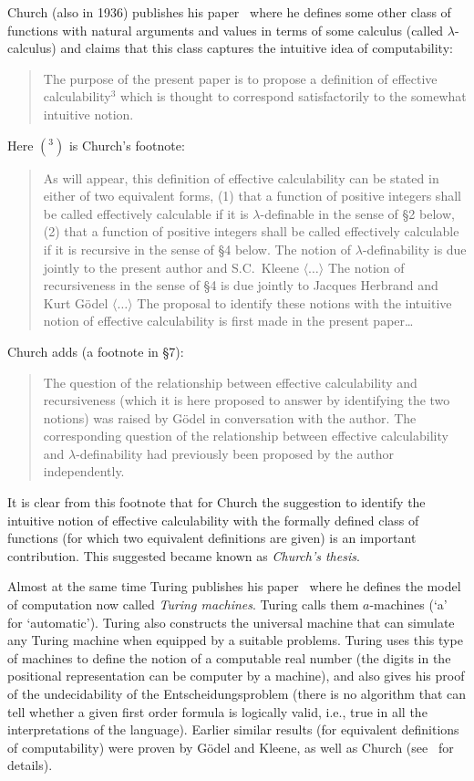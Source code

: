 \documentclass[12pt]{article}
\theoremstyle{remark}
\begin{document}
Church (also in 1936) publishes his paper~\cite{Church1936} where he defines some other class of functions with natural arguments and values in terms of some calculus (called $\lambda$-calculus) and claims that this class captures the intuitive idea of computability:
\begin{quote}
The purpose of the present paper is to propose a definition of effective calculability${}^3$ which is thought to correspond satisfactorily to the somewhat intuitive notion.
\end{quote}
Here $({}^3)$ is Church's footnote: 
\begin{quote}
As will appear, this definition of effective calculability can be stated in either of two equivalent forms, (1) that a function of positive integers shall be called effectively calculable if it is $\lambda$-definable in the sense of \S2 below, (2) that a function of positive integers shall be called effectively calculable if it is recursive in the sense of \S4 below. The notion of $\lambda$-definability is due jointly to the present author and S.C.~Kleene $\langle\ldots\rangle$ The notion of recursiveness in the sense of \S4 is due jointly to Jacques Herbrand and Kurt G\"odel $\langle\ldots\rangle$ The proposal to identify these notions with the intuitive notion of effective calculability is first made in the present paper\ldots
\end{quote}
Church adds (a footnote in \S7): 
\begin{quote}
The question of the relationship between effective calculability and recursiveness (which it is here proposed to answer by identifying the two notions) was raised by G\"{o}del in conversation with the author. The corresponding question of the relationship between effective calculability and $\lambda$-definability had previously been proposed by the author independently.
\end{quote}

It is clear from this footnote that for Church the suggestion to identify the intuitive notion of effective calculability with the formally defined class of functions (for which two equivalent definitions are given) is an important contribution. This suggested became known as \emph{Church's thesis}.

Almost at the same time Turing publishes his paper~\cite{Church1936} where he defines the model of computation now called \emph{Turing machines}. Turing calls them $a$-machines (`a' for `automatic'). Turing also constructs the universal machine that can simulate any Turing machine when equipped by a suitable problems. Turing uses this type of machines to define the notion of a computable real number (the digits in the positional representation can be computer by a machine), and also gives his proof of the undecidability of the Entscheidungsproblem (there is no algorithm that can tell whether a given first order formula is logically valid, i.e., true in all the interpretations of the language). Earlier similar results (for equivalent definitions of computability) were proven by G\"{o}del and Kleene, as well as Church (see~\cite[p.109]{Davis1965} for details).
\end{document}
